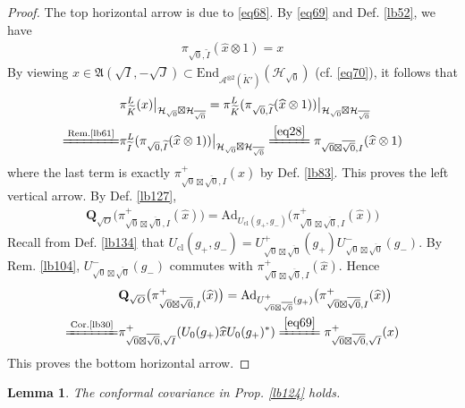 \documentclass[11pt,b5paper,notitlepage]{article}
\theoremstyle{definition}
\theoremstyle{plain}
\newtheorem{lm}[df]{Lemma}
\newcommand{\fk}{\mathfrak}
\newcommand{\wtd}{\widetilde}
\newcommand{\wht}{\widehat}
\newcommand{\ovl}{\overline}
\newcommand{\End}{\mathrm{End}} %
\newcommand{\Ad}{\mathrm{Ad}}
\newcommand{\MH}{\mathcal H}
\newcommand{\Maa}{{\mathcal A^{\otimes 2}}}
\newcommand{\sqz}{{\sqrt 0}}
\newcommand{\Qbf}{\mathbf Q}
\newcommand{\Ucl}{U_{\mathrm{cl}}}
\numberwithin{equation}{section}
\begin{document}
\begin{proof}
The top horizontal arrow is due to \eqref{eq68}. By \eqref{eq69} and Def. \ref{lb52}, we have
\begin{align*}
\pi_{\sqz,\wtd I}(\wht x\otimes 1)=x
\end{align*}
By viewing $x\in \fk A(\sqrt I,-\sqrt J)\subset\End_{\Maa(\wtd K')}(\MH_\sqz)$ (cf. \eqref{eq70}), it follows that
\begin{align*}
&\pi^L_{\wtd K}(x)\big|_{\MH_\sqz\boxtimes\MH_{\ovl\sqz}}=\pi^L_{\wtd K}(\pi_{\sqz,\wtd I}(\wht x\otimes 1))\big|_{\MH_\sqz\boxtimes\MH_{\ovl\sqz}}\\
\xlongequal{\text{Rem.\ref{lb61}}}&\pi^L_{\wtd I}(\pi_{\sqz,\wtd I}(\wht x\otimes 1))\big|_{\MH_\sqz\boxtimes\MH_{\ovl\sqz}}\xlongequal{\eqref{eq28}}\pi_{\sqz\boxtimes\ovl\sqz,I}(\wht x\otimes 1)
\end{align*}
where the last term is exactly $\pi^+_{\sqz\boxtimes\ovl\sqz,I}(\wht x)$ by Def. \ref{lb83}. This proves the left vertical arrow. By Def. \ref{lb127},
\begin{align*}
\Qbf_{\sqrt O}\big(\pi^+_{\sqz\boxtimes\ovl\sqz,I}(\wht x)\big)=\Ad_{\Ucl(g_+,g_-)}\big(\pi^+_{\sqz\boxtimes\ovl\sqz,I}(\wht x)\big)
\end{align*}
Recall from Def. \ref{lb134} that $\Ucl(g_+,g_-)=U^+_{\sqz\boxtimes\ovl\sqz}(g_+)U^-_{\sqz\boxtimes\ovl\sqz}(g_-)$. By Rem. \ref{lb104}, $U^-_{\sqz\boxtimes\ovl\sqz}(g_-)$ commutes with $\pi^+_{\sqz\boxtimes\ovl\sqz,I}(\wht x)$. Hence
\begin{align*}
&\Qbf_{\sqrt O}\big(\pi^+_{\sqz\boxtimes\ovl\sqz,I}(\wht x)\big)=\Ad_{U^+_{\sqz\boxtimes\ovl\sqz}(g_+)}\big(\pi^+_{\sqz\boxtimes\ovl\sqz,I}(\wht x)\big)\\
\xlongequal{\text{Cor.\ref{lb30}}}&\pi^+_{\sqz\boxtimes\ovl\sqz,\sqrt I}(U_0(g_+)\wht x U_0(g_+)^*)\xlongequal{\eqref{eq69}}\pi^+_{\sqz\boxtimes\ovl\sqz,\sqrt I}(x)
\end{align*}
This proves the bottom horizontal arrow.
\end{proof}





\begin{lm}\label{lb125}
The conformal covariance in Prop. \ref{lb124} holds.
\end{lm}
\end{document}
